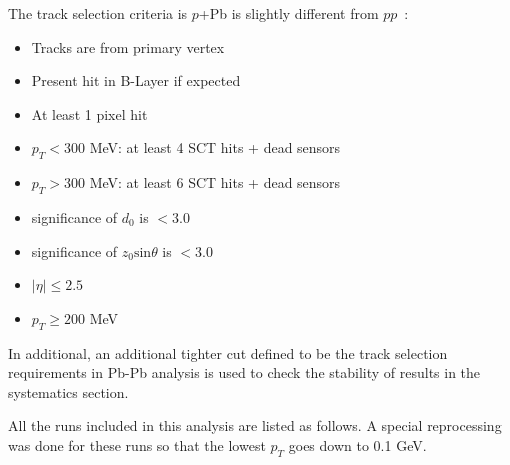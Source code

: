 The track selection criteria is $p$+Pb is slightly different from $pp$~\cite{Aad:2015gqa, Aad:2016mok}:
\begin{itemize}
\item Tracks are from primary vertex
\item Present hit in B-Layer if expected
\item At least 1 pixel hit
\item $p_{T}<300$ MeV: at least 4 SCT hits + dead sensors
\item $p_{T}>300$ MeV: at least 6 SCT hits + dead sensors
\item significance of $d_{0}$ is $<3.0$
\item significance of $z_{0}\text{sin}\theta$ is $<3.0$
\item $|\eta|\le 2.5$
\item $p_{T}\ge 200$ MeV
\end{itemize}
In additional, an additional tighter cut defined to be the track selection requirements in Pb-Pb analysis is used to check the stability of results in the systematics section.

All the runs included in this analysis are listed as follows. A special reprocessing was done for these runs so that the lowest $p_{T}$ goes down to 0.1 GeV.

